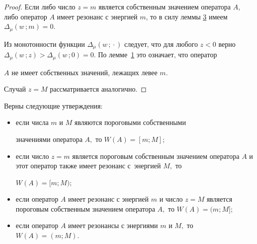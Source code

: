 \smallskip



\begin{proof} Если либо число $z=m$ является собственным значением оператора $A$, либо оператор $A$ имеет резонанс с энергией $m$, то в силу леммы \hyperlink{RD:lemma3}{3} имеем $\Delta_\mu(w\,; m)=0$. 

Из монотонности функции $\Delta_\mu(w\,; {}\cdot{})$ следует, что для любого $z<0$ верно $ \Delta_\mu(w\,; z)>\Delta_\mu(w\,; 0)=0$. По лемме~\hyperlink{RD:lemma1}{1} это означает, что оператор

$A$ не имеет собственных значений, лежащих левее $m$. 



Случай $z=M$ рассматривается аналогично. 

\end{proof}






\pagebreak



\hypertarget{RD:th4}{}



\begin{theorem}[4]Верны следующие утверждения\/$:$

\begin{itemize}

\item[{\rm 1)}] если числа $m$ и $M$ являются пороговыми собственными

значениями оператора $A,$ то $W(A)=[m; M];$

\item[{\rm 2)}] если число $z=m$ является пороговым собственным значением оператора $A$ и этот оператор также имеет резонанс с~энергией $M,$ то

$W(A)=[m; M);$

\item[{\rm 3)}] если оператор $A$ имеет резонанс с энергией $m$ и число $z=M$ является пороговым собственным значением оператора $A,$ то $W(A)=(m; M];$

\item[{\rm 4)}] если оператор $A$ имеет резонансы с энергиями $m$ и $M,$ то $W(A)=(m; M).$



\end{itemize}

\end{theorem}



